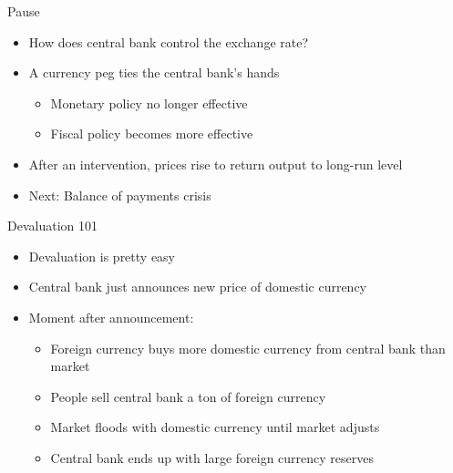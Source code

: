 \documentclass{beamer}
\begin{document}
\begin{frame}{Pause}
    \begin{itemize}
        \item How does central bank control the exchange rate?
        \item A currency peg ties the central bank's hands
        \begin{itemize}
            \item Monetary policy no longer effective
            \item Fiscal policy becomes more effective
        \end{itemize}
        \item After an intervention, prices rise to return output to long-run level
        \item Next: Balance of payments crisis
    \end{itemize}
\end{frame}


\begin{frame}{Devaluation 101}

    \begin{itemize}
        \item Devaluation is pretty easy
        \item Central bank just announces new price of domestic currency
        \item Moment after announcement:
        \begin{itemize}
            \item Foreign currency buys more domestic currency from central bank than market
            \item People sell central bank a ton of foreign currency
            \item Market floods with domestic currency until market adjusts
            \item Central bank ends up with large foreign currency reserves
        \end{itemize}
    \end{itemize}

\end{frame}
\end{document}
